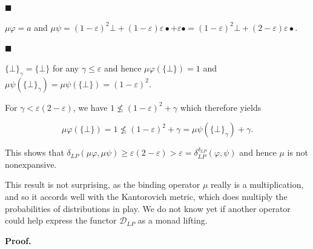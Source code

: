  
 
\par\noindent  $\blacksquare$ 
 
$\mu\varphi=a$ and $\mu\psi=(1-\varepsilon)^{2}\bot+(1-\varepsilon)\varepsilon\bullet+\varepsilon\bullet=(1-\varepsilon)^{2}\bot+(2-\varepsilon)\varepsilon\bullet$.\par
 
 
 
\par\noindent  $\blacksquare$ 
 
$\{\bot\}_{\gamma}=\{\bot\}$ for any $\gamma\leq\varepsilon$ and hence $\mu\varphi(\{\bot\})=1$ and $\mu\psi(\{\bot\}_{\gamma})=\mu\psi(\{\bot\})=(1-\varepsilon)^{2}$.\par
 
 
  
 
 
For $\gamma<\varepsilon(2-\varepsilon)$, we have $1\not\leq(1-\varepsilon)^{2}+\gamma$ which therefore yields\par
  
\par  \quad  \[\mu\varphi(\{\bot\})=1\not\leq(1-\varepsilon)^{2}+\gamma=\mu\psi(\{\bot\}_{\gamma})+\gamma.\]\quad  \quad  
  
This shows that $\delta_{LP}(\mu\varphi,\mu\psi)\geq\varepsilon(2-\varepsilon)>\varepsilon=\delta_{LP}^{\delta_{LP}}(\varphi,\psi)$ and hence $\mu$ is not nonexpansive.\par
 
 
 
 
This result is not surprising, as the binding operator $\mu$ really is a multiplication, and so it accords well with the Kantorovich metric, which does multiply the probabilities of distributions in play. We do not know yet if another operator could help express the functor $\mathcal{D}_{LP}$ as a monad lifting.\par
 
 
 


 
\par\medskip\noindent\textbf{Proof.}\par
 
